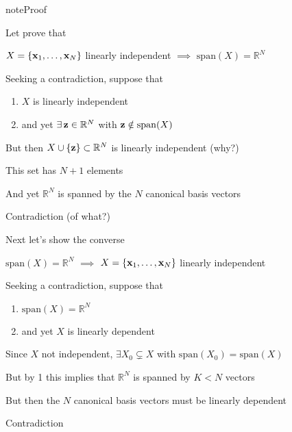 \documentclass[letterpaper,10pt,english]{jupyterBook}
\begin{document}
\begin{sphinxadmonition}{note}{Proof}

\sphinxAtStartPar
Let prove that

\sphinxAtStartPar
\(X= \{ {\bf x}_1, \ldots, {\bf x}_N \}\) linearly independent \(\implies\) \(\mathrm{span}(X) = \mathbb{R}^N\)

\sphinxAtStartPar
Seeking a contradiction, suppose that
\begin{enumerate}
%
\item {} 
\sphinxAtStartPar
\(X \) is linearly independent

\item {} 
\sphinxAtStartPar
and yet \(\exists \, {\bf z} \in \mathbb{R}^N\) with \({\bf z} \notin \mathrm{span}(X)\)

\end{enumerate}

\sphinxAtStartPar
But then \(X \cup \{{\bf z}\} \subset \mathbb{R}^N\) is linearly independent (why?)

\sphinxAtStartPar
This set has \(N+1\) elements

\sphinxAtStartPar
And yet \(\mathbb{R}^N\) is spanned by the \(N\) canonical basis vectors

\sphinxAtStartPar
Contradiction (of what?)

\sphinxAtStartPar
Next let’s show the converse

\sphinxAtStartPar
\(\mathrm{span}(X) = \mathbb{R}^N\)
\(\implies\)
\(X= \{ {\bf x}_1, \ldots, {\bf x}_N \}\) linearly independent

\sphinxAtStartPar
Seeking a contradiction, suppose that
\begin{enumerate}
%
\item {} 
\sphinxAtStartPar
\(\mathrm{span}(X) = \mathbb{R}^N\)

\item {} 
\sphinxAtStartPar
and yet \(X\) is linearly dependent

\end{enumerate}

\sphinxAtStartPar
Since \(X\) not independent, \(\exists X_0 \subsetneq X\) with \(\mathrm{span}(X_0) =
\mathrm{span}(X)\)

\sphinxAtStartPar
But by 1 this implies that \(\mathbb{R}^N\) is spanned by \(K < N\) vectors

\sphinxAtStartPar
But then the \(N\) canonical basis vectors must be linearly dependent

\sphinxAtStartPar
Contradiction
\end{sphinxadmonition}
\end{document}
